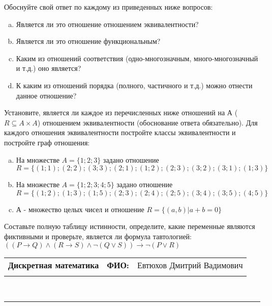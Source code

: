 \documentclass[10pt]{exam}
\newcommand{\class}{Дискретная математика}
\newcommand{\examdate}{}
\begin{document}
\begin{questions}
Обоснуйте свой ответ по каждому из приведенных ниже вопросов:
\begin{enumerate} [a)]\setcounter{enumi}{0}
    \item Является ли это отношение отношением эквивалентности?
    \item Является ли это отношение функциональным?
    \item Каким из отношений соответствия (одно-многозначным, много-многозначный и т.д.) оно является?
    \item К каким из отношений порядка (полного, частичного и т.д.) можно отнести данное отношение?
\end{enumerate}
\question
Установите, является ли каждое из перечисленных ниже отношений на А ($R \subseteq A \times A$) отношением эквивалентности (обоснование ответа обязательно). Для каждого отношения эквивалентности постройте классы 
эквивалентности и постройте граф отношения:
\begin{enumerate} [a)]\setcounter{enumi}{0}
\item На множестве $A = \{1; 2; 3\}$ задано отношение $R = \{(1; 1); (2; 2); (3; 3); (2; 1); (1; 2); (2; 3); (3; 2); (3; 1); (1; 3)\}$
\item На множестве $A = \{1; 2; 3; 4; 5\}$ задано отношение $R = \{(1; 2); (1; 3); (1; 5); (2; 3); (2; 4); (2; 5); (3; 4); (3; 5); (4; 5)\}$
\item А - множество целых чисел и отношение $R = \{(a,b)|a + b = 0\}$
\end{enumerate}\question Составьте полную таблицу истинности, определите, какие переменные являются фиктивными и проверьте, является ли формула тавтологией:
$((P \rightarrow Q) \land (R \rightarrow S) \land \neg (Q \lor S)) \rightarrow \neg (P \lor R)$

\end{questions}
\newpage
\begin{flushright}
\begin{tabular}{p{2.8in} r l}
\textbf{\class} & \textbf{ФИО:} &Евтюхов Дмитрий Вадимович
\\

\textbf{\examdate} &&\\
\end{tabular}\\
\end{flushright}
\rule[1ex]{\textwidth}{.1pt}
\end{document}
